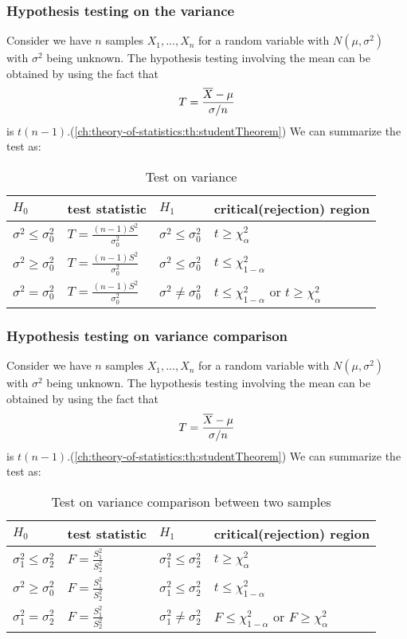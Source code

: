 \begin{refsection}
\subsubsection{Hypothesis testing on the variance}
Consider we have $n$ samples $X_1,...,X_n$ for a random variable with $N(\mu,\sigma^2)$ with $\sigma^2$ being unknown. The hypothesis testing involving the mean can be obtained by using the fact that $$T = \frac{\overline{X} - \mu}{\sigma/n}$$ is $t(n-1)$.(\autoref{ch:theory-of-statistics:th:studentTheorem}) We can summarize the test as:
\begin{table}[H]
	\centering
	\caption{Test on variance }
	\begin{tabular}{|l|l|l|l|}
		\hline
		$H_0$	& test statistic  & $H_1$ & critical(rejection) region \\ \hline
		$\sigma^2 \leq \sigma_0^2$ &$T = \frac{(n-1)S^2}{\sigma_0^2}$ & $\sigma^2 \leq \sigma_0^2$
		&  $t \geq \chi^2_{\alpha}$ \\ \hline
		$\sigma^2 \geq \sigma_0^2$ & $T = \frac{(n-1)S^2}{\sigma_0^2}$ & $\sigma^2 \leq \sigma_0^2$
		& $t\leq \chi^2_{1-\alpha}$ \\ \hline
		$\sigma^2 = \sigma_0^2$ &  $T = \frac{(n-1)S^2}{\sigma_0^2}$ & $\sigma^2 \neq \sigma_0^2$
		&  $t\leq \chi^2_{1-\alpha}$ or $t \geq \chi^2_{\alpha}$\\ \hline
	\end{tabular}
\end{table}


\subsubsection{Hypothesis testing on variance comparison}
Consider we have $n$ samples $X_1,...,X_n$ for a random variable with $N(\mu,\sigma^2)$ with $\sigma^2$ being unknown. The hypothesis testing involving the mean can be obtained by using the fact that $$T = \frac{\overline{X} - \mu}{\sigma/n}$$ is $t(n-1)$.(\autoref{ch:theory-of-statistics:th:studentTheorem}) We can summarize the test as:
\begin{table}[H]
	\centering
	\caption{Test on variance comparison between two samples }
	\begin{tabular}{|l|l|l|l|}
		\hline
		$H_0$	& test statistic  & $H_1$ & critical(rejection) region \\ \hline
		$\sigma_1^2 \leq \sigma_2^2$ &$F = \frac{S^2_1}{S^2_2}$ & $\sigma_1^2 \leq \sigma_2^2$
		&  $t \geq \chi^2_{\alpha}$ \\ \hline
		$\sigma^2 \geq \sigma_0^2$ & $F = \frac{S^2_1}{S^2_2}$ & $\sigma_1^2 \leq \sigma_2^2$
		& $t\leq \chi^2_{1-\alpha}$ \\ \hline
		$\sigma_1^2 = \sigma_2^2$ &  $F = \frac{S^2_1}{S^2_2}$ & $\sigma_1^2 \neq \sigma_2^2$
		&  $F\leq \chi^2_{1-\alpha}$ or $F \geq \chi^2_{\alpha}$\\ \hline
	\end{tabular}
\end{table}



\end{refsection}
